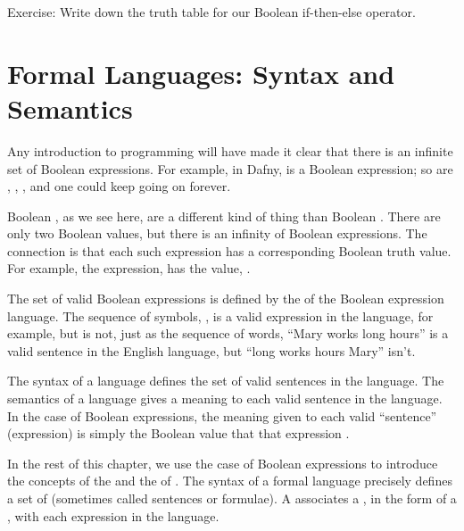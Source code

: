 \documentclass[letterpaper,10pt,english]{sphinxmanual}
\begin{document}
Exercise: Write down the truth table for our Boolean if-then-else
operator.


\section{Formal Languages: Syntax and Semantics}
\label{\detokenize{07-boolean-algebra:formal-languages-syntax-and-semantics}}
Any introduction to programming will have made it clear that there is
an infinite set of Boolean expressions. For example, in Dafny, 
is a Boolean expression; so are , , , and one could keep going on forever.

Boolean , as we see here, are a different kind of thing
than Boolean . There are only two Boolean values, but there is
an infinity of Boolean expressions. The connection is that each such
expression has a corresponding Boolean truth value. For example, the
expression,  has the value, .

The set of valid Boolean expressions is defined by the  of the
Boolean expression language. The sequence of symbols, , is a valid expression in the language, for example, but
 is not, just as the sequence of words,
“Mary works long hours” is a valid sentence in the English language,
but “long works hours Mary” isn’t.

The syntax of a language defines the set of valid sentences in the
language. The semantics of a language gives a meaning to each valid
sentence in the language. In the case of Boolean expressions, the
meaning given to each valid “sentence” (expression) is simply the
Boolean value that that expression .

In the rest of this chapter, we use the case of Boolean expressions to
introduce the concepts of the  and the  of . The syntax of a formal language precisely defines a set of
 (sometimes called sentences or formulae). A 
associates a , in the form of a , with each expression
in the language.
\end{document}
